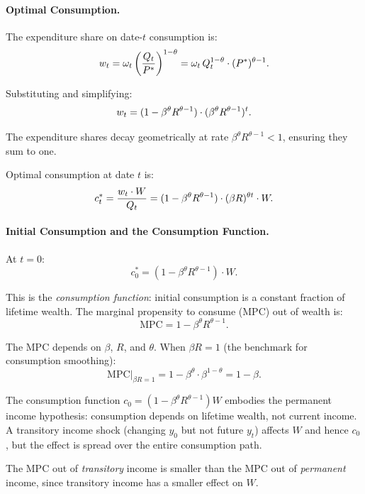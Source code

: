 \paragraph{Optimal Consumption.}
The expenditure share on date-$t$ consumption is:
\begin{equation}
w_t = \omega_t \left( \frac{Q_t}{P^{*}} \right)^{1-\theta} = \omega_t \, Q_t^{1-\theta} \cdot (P^{*})^{\theta - 1}.
\label{eq:share-infinity}
\end{equation}

Substituting and simplifying:
\begin{equation}
w_t = (1 - \beta^\theta R^{\theta - 1}) \cdot (\beta^\theta R^{\theta - 1})^t.
\label{eq:share-infinity-explicit}
\end{equation}

The expenditure shares decay geometrically at rate $\beta^\theta R^{\theta - 1} < 1$, ensuring they sum to one.

Optimal consumption at date $t$ is:
\begin{equation}
c_t^* = \frac{w_t \cdot W}{Q_t} = (1 - \beta^\theta R^{\theta - 1}) \cdot (\beta R)^{\theta t} \cdot W.
\label{eq:consumption-infinity}
\end{equation}

\paragraph{Initial Consumption and the Consumption Function.}
At $t = 0$:
\begin{equation}
\boxed{c_0^* = (1 - \beta^\theta R^{\theta - 1}) \cdot W.}
\label{eq:c0-infinity}
\end{equation}

This is the \emph{consumption function}: initial consumption is a constant fraction of lifetime wealth. The marginal propensity to consume (MPC) out of wealth is:
\begin{equation}
\text{MPC} = 1 - \beta^\theta R^{\theta - 1}.
\label{eq:mpc}
\end{equation}

The MPC depends on $\beta$, $R$, and $\theta$. When $\beta R = 1$ (the benchmark for consumption smoothing):
\begin{equation}
\text{MPC}\big|_{\beta R = 1} = 1 - \beta^{\theta} \cdot \beta^{1 - \theta} = 1 - \beta.
\label{eq:mpc-benchmark}
\end{equation}

\begin{calloutnote}
The consumption function $c_0 = (1 - \beta^\theta R^{\theta - 1}) W$ embodies the permanent income hypothesis: consumption depends on lifetime wealth, not current income. A transitory income shock (changing $y_0$ but not future $y_t$) affects $W$ and hence $c_0$, but the effect is spread over the entire consumption path.

The MPC out of \emph{transitory} income is smaller than the MPC out of \emph{permanent} income, since transitory income has a smaller effect on $W$.
\end{calloutnote}

